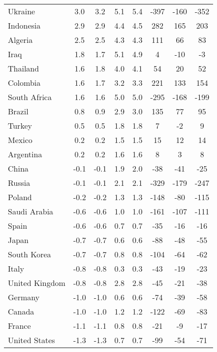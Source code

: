 \begin{tabular}[t]{lccccccc}
Ukraine & 3.0 & 3.2 & 5.1 & 5.4 & -397 & -160 & -352\\
Indonesia & 2.9 & 2.9 & 4.4 & 4.5 & 282 & 165 & 203\\
Algeria & 2.5 & 2.5 & 4.3 & 4.3 & 111 & 66 & 83\\
Iraq & 1.8 & 1.7 & 5.1 & 4.9 & 4 & -10 & -3\\
Thailand & 1.6 & 1.8 & 4.0 & 4.1 & 54 & 20 & 52\\
Colombia & 1.6 & 1.7 & 3.2 & 3.3 & 221 & 133 & 154\\
South Africa & 1.6 & 1.6 & 5.0 & 5.0 & -295 & -168 & -199\\
Brazil & 0.8 & 0.9 & 2.9 & 3.0 & 135 & 77 & 95\\
Turkey & 0.5 & 0.5 & 1.8 & 1.8 & 7 & -2 & 9\\
Mexico & 0.2 & 0.2 & 1.5 & 1.5 & 15 & 12 & 14\\
Argentina & 0.2 & 0.2 & 1.6 & 1.6 & 8 & 3 & 8\\
China & -0.1 & -0.1 & 1.9 & 2.0 & -38 & -41 & -25\\
Russia & -0.1 & -0.1 & 2.1 & 2.1 & -329 & -179 & -247\\
Poland & -0.2 & -0.2 & 1.3 & 1.3 & -148 & -80 & -115\\
Saudi Arabia & -0.6 & -0.6 & 1.0 & 1.0 & -161 & -107 & -111\\
Spain & -0.6 & -0.6 & 0.7 & 0.7 & -35 & -16 & -16\\
Japan & -0.7 & -0.7 & 0.6 & 0.6 & -88 & -48 & -55\\
South Korea & -0.7 & -0.7 & 0.8 & 0.8 & -104 & -64 & -62\\
Italy & -0.8 & -0.8 & 0.3 & 0.3 & -43 & -19 & -23\\
United Kingdom & -0.8 & -0.8 & 2.8 & 2.8 & -45 & -21 & -38\\
Germany & -1.0 & -1.0 & 0.6 & 0.6 & -74 & -39 & -58\\
Canada & -1.0 & -1.0 & 1.2 & 1.2 & -122 & -69 & -83\\
France & -1.1 & -1.1 & 0.8 & 0.8 & -21 & -9 & -17\\
United States & -1.3 & -1.3 & 0.7 & 0.7 & -99 & -54 & -71\\
\bottomrule
\end{tabular}